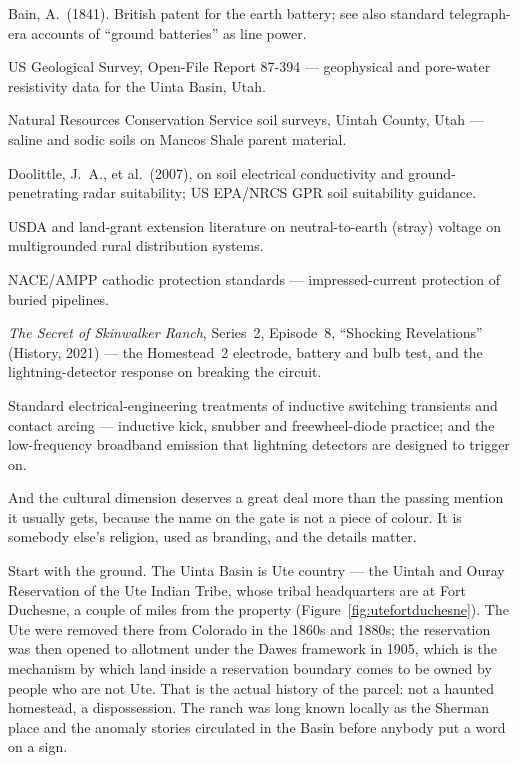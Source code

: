 \begin{srcnotes}
\item Bain, A.\ (1841). British patent for the earth battery; see also standard telegraph-era
accounts of ``ground batteries'' as line power.
\item US Geological Survey, Open-File Report 87-394 --- geophysical and pore-water resistivity data
for the Uinta Basin, Utah.
\item Natural Resources Conservation Service soil surveys, Uintah County, Utah --- saline and sodic
soils on Mancos Shale parent material.
\item Doolittle, J.\ A., et al.\ (2007), on soil electrical conductivity and ground-penetrating
radar suitability; US EPA/NRCS GPR soil suitability guidance.
\item USDA and land-grant extension literature on neutral-to-earth (stray) voltage on
multigrounded rural distribution systems.
\item NACE/AMPP cathodic protection standards --- impressed-current protection of buried pipelines.
\item \emph{The Secret of Skinwalker Ranch}, Series~2, Episode~8, ``Shocking Revelations''
(History, 2021) --- the Homestead~2 electrode, battery and bulb test, and the lightning-detector
response on breaking the circuit.
\item Standard electrical-engineering treatments of inductive switching transients and contact arcing
--- inductive kick, snubber and freewheel-diode practice; and the low-frequency broadband emission
that lightning detectors are designed to trigger on.
\end{srcnotes}

And the cultural dimension deserves a great deal more than the passing mention it usually gets,
because the name on the gate is not a piece of colour. It is somebody else's religion, used as
branding, and the details matter.

Start with the ground. The Uinta Basin is Ute country --- the Uintah and Ouray Reservation of the
Ute Indian Tribe, whose tribal headquarters are at Fort Duchesne, a couple of miles from the
property (Figure~\ref{fig:utefortduchesne}). The Ute were removed there from Colorado in the
1860s and 1880s; the reservation was then opened to allotment under the Dawes framework in 1905,
which is the mechanism by which land inside a reservation boundary comes to be owned by people who
are not Ute. That is the actual history of the parcel: not a haunted homestead, a dispossession.
The ranch was long known locally as the Sherman place and the anomaly stories circulated in the
Basin before anybody put a word on a sign.

